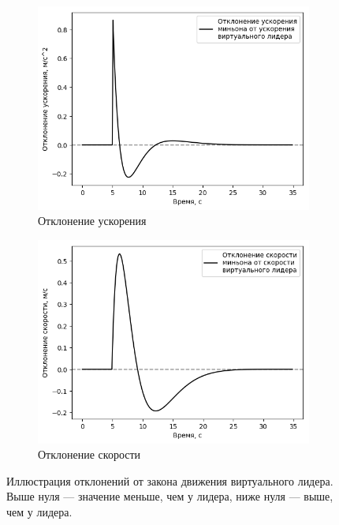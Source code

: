 \documentclass[12pt,a4paper]{article}
\begin{document}
\begin{figure}[!htbp]
	\centering
	\begin{subfigure}{.5\textwidth}
	\centering
	\includegraphics[width=1\linewidth]{minion/heviside_axerr}
	\caption{Отклонение ускорения}
	\label{fig:hevisideaxerr}
	\end{subfigure}%
	\begin{subfigure}{.5\textwidth}
	\centering
	\includegraphics[width=1\linewidth]{minion/heviside_velerr}
	\caption{Отклонение скорости}
	\label{fig:hevisidevelerr}
	\end{subfigure}
	\caption{Иллюстрация отклонений от закона движения виртуального лидера. Выше нуля — значение меньше, чем у лидера, ниже нуля — выше, чем у лидера.}
	\label{fig:errors-minion-heviside}
\end{figure}
\end{document}

